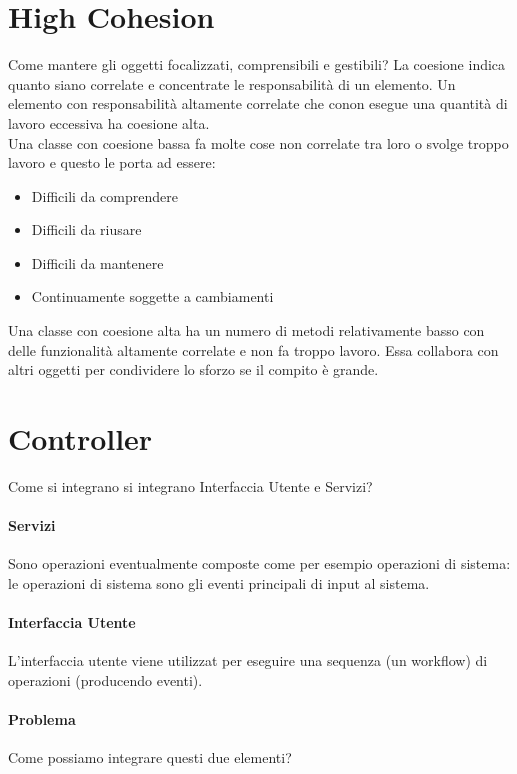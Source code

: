 \section{High Cohesion}
Come mantere gli oggetti focalizzati, comprensibili e gestibili? La coesione indica quanto siano
correlate e concentrate le responsabilità di un elemento. Un elemento con responsabilità
altamente correlate che conon esegue una quantità di lavoro eccessiva ha coesione alta. 
\\ Una classe con coesione bassa fa molte cose non correlate tra loro o svolge troppo
lavoro e questo le porta ad essere:
\begin{itemize}
    \item Difficili da comprendere
    \item Difficili da riusare
    \item Difficili da mantenere
    \item Continuamente soggette a cambiamenti
\end{itemize}
Una classe con coesione alta ha un numero di metodi relativamente basso con delle funzionalità
altamente correlate e non fa troppo lavoro. Essa collabora con altri oggetti per
condividere lo sforzo se il compito è grande.
\section{Controller}
Come si integrano si integrano Interfaccia Utente e Servizi?
\paragraph*{Servizi} Sono operazioni eventualmente composte come per esempio
operazioni di sistema: le operazioni di sistema sono gli eventi principali di input al sistema.
\paragraph*{Interfaccia Utente} L'interfaccia utente viene utilizzat per eseguire una sequenza
(un workflow) di operazioni (producendo eventi).
\paragraph*{Problema} Come possiamo integrare questi due elementi?
